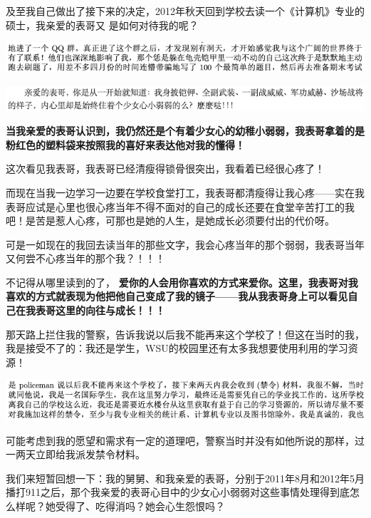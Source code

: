 \documentclass[9pt, b5paper]{article}
\begin{document}
及至我自己做出了接下来的决定，2012年秋天回到学校去读一个《计算机》专业的硕士，我亲爱的表哥又 是如何对待我的呢？

\begin{center}
\includegraphics[width=.9\linewidth]{./pic/backups_plans_20210421_095520.png}
\end{center}

\begin{center}
\includegraphics[width=.9\linewidth]{./pic/backups_plans_20210506_123721.png}
\end{center}

\textbf{当我亲爱的表哥认识到，我仍然还是个有着少女心的幼稚小弱弱，我表哥拿着的是粉红色的塑料袋来按照我的喜好来表达他对我的懂得！}

这次看见我表哥，我表哥已经清瘦得锁骨很突出，我看着已经很心疼了！

而现在当我一边学习一边要在学校食堂打工，我表哥都清瘦得让我心疼——实在我表哥应试是心里也很心疼当年不得不面对的自己的成长还要在食堂辛苦打工的我吧！是苦是惹人心疼，可那也是她的人生，是她成长必须要付出的代价呀。

可是一如现在的我回去读当年的那些文字，我会心疼当年的那个弱弱，我表哥当年又何尝不心疼当年的那个我？！！！

不记得从哪里读到的了， \textbf{爱你的人会用你喜欢的方式来爱你。这里，我表哥对我喜欢的方式就表现为他把他自己变成了我的镜子——我从我表哥身上可以看见自己在我表哥这里的向往与成长！！！}

那天路上拦住我的警察，告诉我说以后我不能再来这个学校了！但这在当时的我，我是接受不了的：我还是学生，WSU的校园里还有太多我想要使用利用的学习资源！

\begin{center}
\includegraphics[width=.9\linewidth]{./pic/backups_plans_20210505_205235.png}
\end{center}

可能考虑到我的愿望和需求有一定的道理吧，警察当时并没有如他所说的那样，过一两天立即给我派发禁令材料。

我们来短暂回想一下：我的舅舅、和我亲爱的表哥，分别于2011年8月和2012年5月播打911之后，那个我亲爱的表哥心目中的少女心小弱弱对这些事情处理得到底怎么样呢？她受得了、吃得消吗？她会心生怨恨吗？
\end{document}
